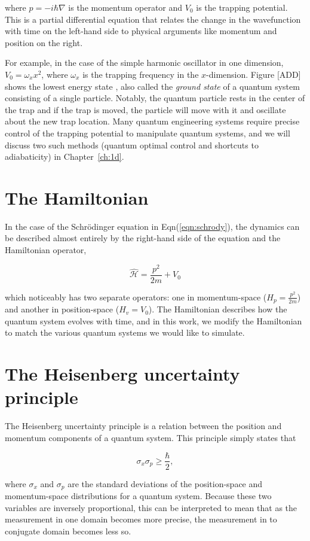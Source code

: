\noindent where $p = -i\hbar\nabla$ is the momentum operator and $V_0$ is the trapping potential.
This is a partial differential equation that relates the change in the wavefunction with time on the left-hand side to physical arguments like momentum and position on the right.

For example, in the case of the simple harmonic oscillator in one dimension, $V_0 = \omega_x x^2$, where $\omega_x$ is the trapping frequency in the $x$-dimension.
Figure [ADD] shows the lowest energy state , also called the \textit{ground state} of a quantum system consisting of a single particle.
Notably, the quantum particle rests in the center of the trap and if the trap is moved, the particle will move with it and oscillate about the new trap location.
Many quantum engineering systems require precise control of the trapping potential to manipulate quantum systems, and we will discuss two such methods (quantum optimal control and shortcuts to adiabaticity) in Chapter~\ref{ch:1d}.

\section{The Hamiltonian}

In the case of the Schr\"odinger equation in Eqn(\ref{eqn:schrody}), the dynamics can be described almost entirely by the right-hand side of the equation and the Hamiltonian operator,

\begin{equation}
\mathcal{\hat H} = \frac{p^2}{2m} + V_0
\end{equation}

\noindent which noticeably has two separate operators: one in momentum-space ($H_p = \frac{p^2}{2m}$) and another in position-space ($H_v = V_0$).
The Hamiltonian describes how the quantum system evolves with time, and in this work, we modify the Hamiltonian to match the various quantum systems we would like to simulate.

\section{The Heisenberg uncertainty principle}

The Heisenberg uncertainty principle is a relation between the position and momentum components of a quantum system.
This principle simply states that

$$
\sigma_x \sigma_p \geq \frac{\hbar}{2},
$$

where $\sigma_x$ and $\sigma_p$ are the standard deviations of the position-space and momentum-space distributions for a quantum system.
Because these two variables are inversely proportional, this can be interpreted to mean that as the measurement in one domain becomes more precise, the measurement in to conjugate domain becomes less so.

